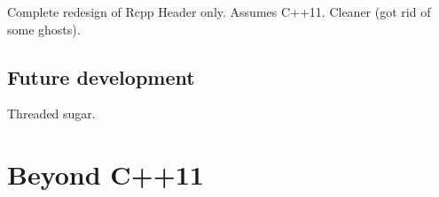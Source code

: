 Complete redesign of Rcpp
Header only. Assumes C++11.
Cleaner (got rid of some ghosts). 

\subsection{Future development}

Threaded sugar. 

\section{Beyond C++11}



\address{Romain François\\
    R Enthusiasts\\
    1 place de l'égalité. 42400 Saint Chamond\\
    FRANCE }
    

